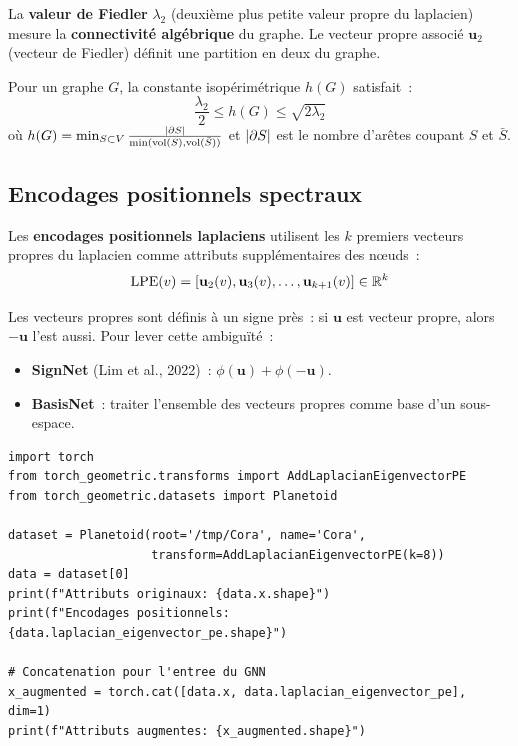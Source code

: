 \begin{definition}
La \textbf{valeur de Fiedler} $\lambda_2$ (deuxi\`eme plus petite valeur propre
du laplacien) mesure la \textbf{connectivit\'e alg\'ebrique} du graphe. Le
vecteur propre associ\'e $\mathbf{u}_2$ (vecteur de Fiedler) d\'efinit une
partition en deux du graphe.
\end{definition}

\begin{theoreme}
Pour un graphe $G$, la constante isop\'erim\'etrique $h(G)$ satisfait~:
\[
    \frac{\lambda_2}{2} \leq h(G) \leq \sqrt{2\lambda_2}
\]
o\`u $h(G) = \min_{S \subset V} \frac{\left| \partial S \right|}{\min(\mathrm{vol}(S),
\mathrm{vol}(\bar{S}))}$ et $\left| \partial S \right|$ est le nombre d'ar\^etes
coupant $S$ et $\bar{S}$.
\end{theoreme}

\subsection{Encodages positionnels spectraux}

\begin{definition}
Les \textbf{encodages positionnels laplaciens} utilisent les $k$ premiers
vecteurs propres du laplacien comme attributs suppl\'ementaires des n\oe uds~:
\[
    \text{LPE}(v) = [\mathbf{u}_2(v), \mathbf{u}_3(v), \ldots, \mathbf{u}_{k+1}(v)]
    \in \mathbb{R}^k
\]
\end{definition}

\begin{attention}[title=\textbf{Ambigu\"it\'e de signe}]
Les vecteurs propres sont d\'efinis \`a un signe pr\`es~: si $\mathbf{u}$ est
vecteur propre, alors $-\mathbf{u}$ l'est aussi. Pour lever cette ambigu\"it\'e~:
\begin{itemize}
    \item \textbf{SignNet} (Lim et al., 2022)~: $\phi(\mathbf{u}) + \phi(-\mathbf{u})$.
    \item \textbf{BasisNet}~: traiter l'ensemble des vecteurs propres comme
          base d'un sous-espace.
\end{itemize}
\end{attention}

\begin{codeblock}[title=\textbf{Encodages positionnels spectraux}]
\begin{verbatim}
import torch
from torch_geometric.transforms import AddLaplacianEigenvectorPE
from torch_geometric.datasets import Planetoid

dataset = Planetoid(root='/tmp/Cora', name='Cora',
                    transform=AddLaplacianEigenvectorPE(k=8))
data = dataset[0]
print(f"Attributs originaux: {data.x.shape}")
print(f"Encodages positionnels: {data.laplacian_eigenvector_pe.shape}")

# Concatenation pour l'entree du GNN
x_augmented = torch.cat([data.x, data.laplacian_eigenvector_pe], dim=1)
print(f"Attributs augmentes: {x_augmented.shape}")
\end{verbatim}
\end{codeblock}

